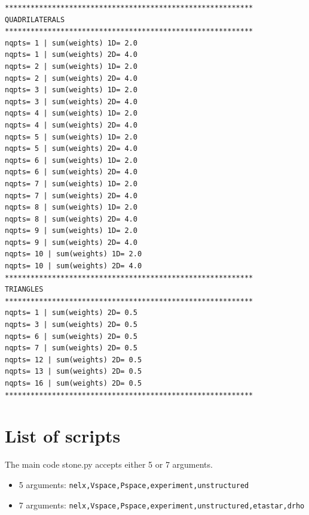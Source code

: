 \begin{tiny}
\begin{verbatim}
**********************************************************
QUADRILATERALS
**********************************************************
nqpts= 1 | sum(weights) 1D= 2.0
nqpts= 1 | sum(weights) 2D= 4.0
nqpts= 2 | sum(weights) 1D= 2.0
nqpts= 2 | sum(weights) 2D= 4.0
nqpts= 3 | sum(weights) 1D= 2.0
nqpts= 3 | sum(weights) 2D= 4.0
nqpts= 4 | sum(weights) 1D= 2.0
nqpts= 4 | sum(weights) 2D= 4.0
nqpts= 5 | sum(weights) 1D= 2.0
nqpts= 5 | sum(weights) 2D= 4.0
nqpts= 6 | sum(weights) 1D= 2.0
nqpts= 6 | sum(weights) 2D= 4.0
nqpts= 7 | sum(weights) 1D= 2.0 
nqpts= 7 | sum(weights) 2D= 4.0 
nqpts= 8 | sum(weights) 1D= 2.0
nqpts= 8 | sum(weights) 2D= 4.0
nqpts= 9 | sum(weights) 1D= 2.0
nqpts= 9 | sum(weights) 2D= 4.0 
nqpts= 10 | sum(weights) 1D= 2.0
nqpts= 10 | sum(weights) 2D= 4.0
**********************************************************
TRIANGLES
**********************************************************
nqpts= 1 | sum(weights) 2D= 0.5
nqpts= 3 | sum(weights) 2D= 0.5
nqpts= 6 | sum(weights) 2D= 0.5
nqpts= 7 | sum(weights) 2D= 0.5
nqpts= 12 | sum(weights) 2D= 0.5
nqpts= 13 | sum(weights) 2D= 0.5
nqpts= 16 | sum(weights) 2D= 0.5
**********************************************************
\end{verbatim}
\end{tiny}





\newpage
\section*{List of scripts}

The main code {\pythonfile stone.py} accepts either 5 or 7 arguments.

\begin{itemize}
\item 5 arguments: \lstinline{nelx,Vspace,Pspace,experiment,unstructured}
\item 7 arguments: \lstinline{nelx,Vspace,Pspace,experiment,unstructured,etastar,drho}
\end{itemize} 

